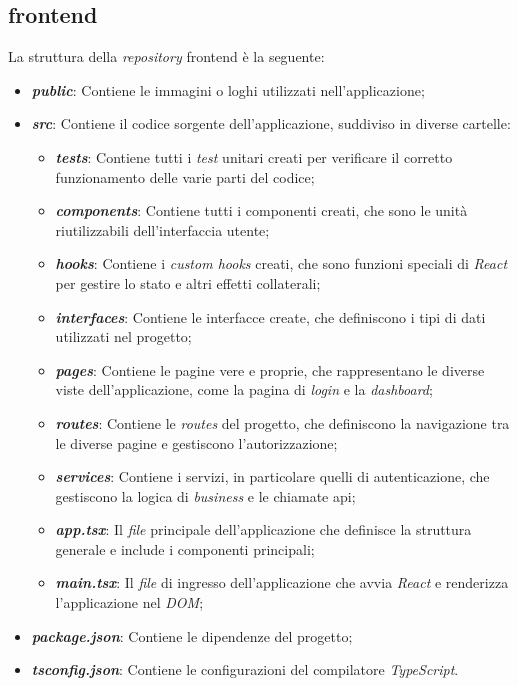 \subsection{\gls{frontend}}
\label{sez:frontend}

La struttura della \textit{repository} \gls{frontend} è la seguente:

\begin{itemize}
    \item \textbf{\textit{public}}: Contiene le immagini o loghi utilizzati nell'applicazione;
    \item \textbf{\textit{src}}: Contiene il codice sorgente dell'applicazione, suddiviso in diverse cartelle:
    \begin{itemize}
        \item \textbf{\textit{tests}}: Contiene tutti i \textit{test} unitari creati per verificare il corretto funzionamento delle varie parti del codice;
        \item \textbf{\textit{components}}: Contiene tutti i componenti creati, che sono le unità riutilizzabili dell'interfaccia utente;
        \item \textbf{\textit{hooks}}: Contiene i \textit{custom hooks} creati, che sono funzioni speciali di \textit{React} per gestire lo stato e altri effetti collaterali;
        \item \textbf{\textit{interfaces}}: Contiene le interfacce create, che definiscono i tipi di dati utilizzati nel progetto;
        \item \textbf{\textit{pages}}: Contiene le pagine vere e proprie, che rappresentano le diverse viste dell'applicazione, come la pagina di \textit{login} e la \textit{dashboard};
        \item \textbf{\textit{routes}}: Contiene le \textit{routes} del progetto, che definiscono la navigazione tra le diverse pagine e gestiscono l'autorizzazione;
        \item \textbf{\textit{services}}: Contiene i servizi, in particolare quelli di autenticazione, che gestiscono la logica di \textit{business} e le chiamate \gls{api};
        \item \textbf{\textit{app.tsx}}: Il \textit{file} principale dell'applicazione che definisce la struttura generale e include i componenti principali;
        \item \textbf{\textit{main.tsx}}: Il \textit{file} di ingresso dell'applicazione che avvia \textit{React} e renderizza l'applicazione nel \textit{DOM};
    \end{itemize}
    \item \textbf{\textit{package.json}}: Contiene le dipendenze del progetto;
    \item \textbf{\textit{tsconfig.json}}: Contiene le configurazioni del compilatore \textit{TypeScript}.
\end{itemize}

